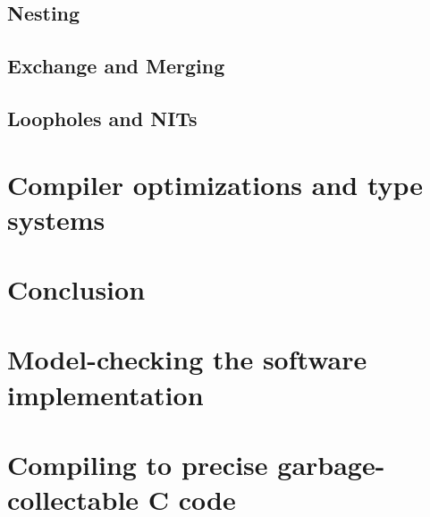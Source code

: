 \documentclass{phd-thesis}
\begin{document}
\section{Nesting}
\section{Exchange and Merging}
\section{Loopholes and NITs}

\chapter{Compiler optimizations and type systems}

\chapter{Conclusion}
\appendix
\chapter{Model-checking the software implementation}

\chapter{Compiling to precise garbage-collectable C code}

\backmatter
\nocite{*}

\end{document}
